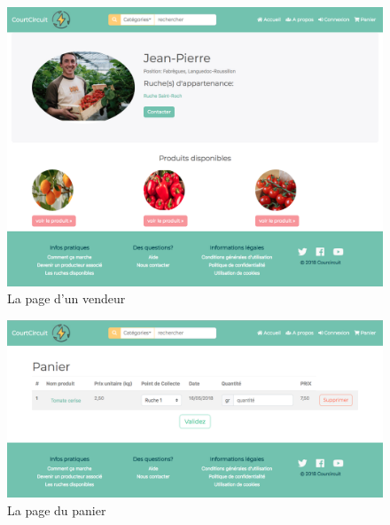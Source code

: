 \documentclass[a4paper,12pt]{report}
\theoremstyle{break}
\theoremstyle{break}
\theoremstyle{break}
\theoremstyle{break}
\theoremstyle{definition}
\theoremstyle{remark}
\begin{document}
\begin{appendices}
\begin{figure}[!ht]
  \centering
  \includegraphics[scale=0.35]{images/vendeur.png}
  \caption{La page d'un vendeur}
\end{figure}

\begin{figure}[!ht]
  \centering
  \includegraphics[scale=0.35]{images/panier.png}
  \caption{La page du panier}
\end{figure}
\end{appendices}
\end{document}
